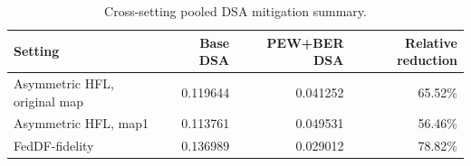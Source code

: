 \begin{table}[t]
\centering
\small
\caption{Cross-setting pooled DSA mitigation summary.}
\label{tab:cross-setting}
\begin{tabular}{lrrr}
\toprule
Setting & Base DSA & PEW+BER DSA & Relative reduction \\
\midrule
Asymmetric HFL, original map & 0.119644 & 0.041252 & 65.52\% \\
Asymmetric HFL, map1 & 0.113761 & 0.049531 & 56.46\% \\
FedDF-fidelity & 0.136989 & 0.029012 & 78.82\% \\
\bottomrule
\end{tabular}
\end{table}
